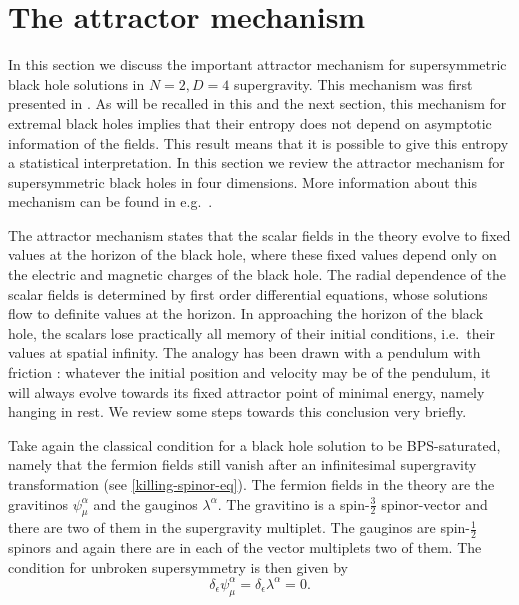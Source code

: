 \documentclass[12pt,twoside]{book}
\begin{document}
\section{The attractor mechanism}


In this section we discuss the important attractor mechanism for supersymmetric black hole solutions in $N=2, D=4$ supergravity. This mechanism was first presented in \cite{Ferrara:bh,strominger:n2bh}. As will be recalled in this and the next section, this mechanism for extremal black holes implies that their entropy does not depend on asymptotic information of the fields. This result means that it is possible to give this entropy a statistical interpretation. In this section we review the attractor mechanism for supersymmetric black holes in four dimensions. More information about this mechanism can be found in e.g.\ \cite{DAuria:uq,string-bbs,Ferrara:1996if,Pioline:uq}.

The attractor mechanism states that the scalar fields in the theory evolve to fixed values at the horizon of the black hole, where these fixed values depend only on the electric and magnetic charges of the black hole. The radial dependence of the scalar fields is determined by first order differential equations, whose solutions flow to definite values at the horizon. In approaching the horizon of the black hole, the scalars lose practically all memory of their initial conditions, i.e.\ their values at spatial infinity. The analogy has been drawn with a pendulum with friction \cite{string-bbs}: whatever the initial position and velocity may be of the pendulum, it will always evolve towards its fixed attractor point of minimal energy, namely hanging in rest. We review some steps towards this conclusion very briefly.\newline

Take again the classical condition for a black hole solution to be BPS-saturated, namely that the fermion fields still vanish after an infinitesimal supergravity transformation (see \eqref{killing-spinor-eq}). The fermion fields in the theory are the gravitinos $\psi_{\mu}^{\alpha}$ and the gauginos $\lambda^{\alpha}$. The gravitino is a spin-$\frac{3}{2}$ spinor-vector and there are two of them in the supergravity multiplet. The gauginos are spin-$\frac{1}{2}$ spinors and again there are in each of the vector multiplets two of them. The condition for unbroken supersymmetry is then given by
\begin{equation}\label{kill-spinor-eqN=2D=4}
\delta_{\epsilon} \psi_{\mu}^{\alpha} = \delta_{\epsilon} \lambda^{\alpha} = 0.
\end{equation}
\end{document}
